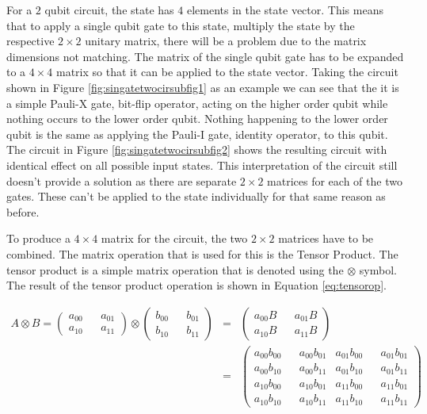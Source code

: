 For a $2$ qubit circuit, the state has $4$ elements in the state vector.
This means that to apply a single qubit gate to this state, multiply the state by the respective $2\times{2}$ unitary matrix, there will be a problem due to the matrix dimensions not matching.
The matrix of the single qubit gate has to be expanded to a $4\times{4}$ matrix so that it can be applied to the state vector.
Taking the circuit shown in Figure \ref{fig:singatetwocirsubfig1} as an example we can see that the it is a simple Pauli-X gate, bit-flip operator, acting on the higher order qubit while nothing occurs to the lower order qubit.
Nothing happening to the lower order qubit is the same as applying the Pauli-I gate, identity operator, to this qubit.
The circuit in Figure \ref{fig:singatetwocirsubfig2} shows the resulting circuit with identical effect on all possible input states.
This interpretation of the circuit still doesn't provide a solution as there are separate $2\times{2}$ matrices for each of the two gates.
These can't be applied to the state individually for that same reason as before.

To produce a $4\times{4}$ matrix for the circuit, the two $2\times{2}$ matrices have to be combined.
The matrix operation that is used for this is the Tensor Product.
The tensor product is a simple matrix operation that is denoted using the $\otimes$ symbol.
The result of the tensor product operation is shown in Equation \ref{eq:tensorop}.

\begin{eqnarray}
A \otimes B = 
\begin{pmatrix}
a_{00} && a_{01} \\
a_{10} && a_{11}
\end{pmatrix}
\otimes
\begin{pmatrix}
b_{00} && b_{01} \\
b_{10} && b_{11}
\end{pmatrix}
&=&
\begin{pmatrix}
a_{00}B && a_{01}B \\
a_{10}B && a_{11}B
\end{pmatrix} \nonumber \\
&=&
\begin{pmatrix}
a_{00}b_{00} && a_{00}b_{01} & a_{01}b_{00} && a_{01}b_{01}\\
a_{00}b_{10} && a_{00}b_{11} & a_{01}b_{10} && a_{01}b_{11}\\
a_{10}b_{00} && a_{10}b_{01} & a_{11}b_{00} && a_{11}b_{01}\\
a_{10}b_{10} && a_{10}b_{11} & a_{11}b_{10} && a_{11}b_{11}
\end{pmatrix}
\label{eq:tensorop}
\end{eqnarray}

